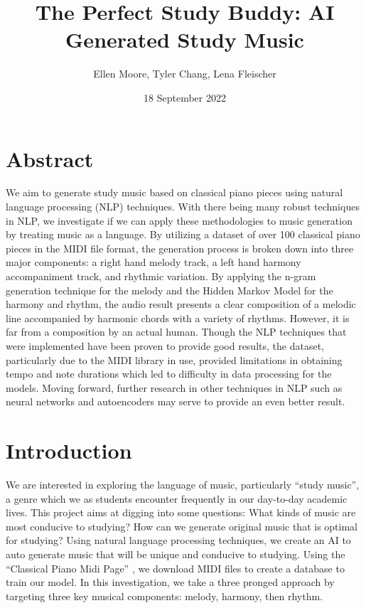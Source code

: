 \documentclass{article}
\title{The Perfect Study Buddy: AI Generated Study Music}
\author{Ellen Moore, Tyler Chang, Lena Fleischer}
\date{18 September 2022}
\begin{document}
\maketitle

\section{Abstract}
We aim to generate study music based on classical piano pieces using natural language processing (NLP) techniques. With there being many robust techniques in NLP, we investigate if we can apply these methodologies to music generation by treating music as a language. By utilizing a dataset of over 100 classical piano pieces in the MIDI file format, the generation process is broken down into three major components: a right hand melody track, a left hand harmony accompaniment track, and rhythmic variation. By applying the n-gram generation technique for the melody and the Hidden Markov Model for the harmony and rhythm, the audio result presents a clear composition of a melodic line accompanied by harmonic chords with a variety of rhythms. However, it is far from a composition by an actual human. Though the NLP techniques that were implemented have been proven to provide good results, the dataset, particularly due to the MIDI library in use, provided limitations in obtaining tempo and note durations which led to difficulty in data processing for the models. Moving forward, further research in other techniques in NLP such as neural networks and autoencoders may serve to provide an even better result.

\section{Introduction}
We are interested in exploring the language of music, particularly “study music”, a genre which we as students encounter frequently in our day-to-day academic lives. This project aims at digging into some questions: What kinds of music are most conducive to studying? How can we generate original music that is optimal for studying? Using natural language processing techniques, we create an AI to auto generate music that will be unique and conducive to studying. Using the “Classical Piano Midi Page” \cite{Mozart}, we download MIDI files to create a database to train our model. In this investigation, we take a three pronged approach by targeting three key musical components: melody, harmony, then rhythm. 
\end{document}

